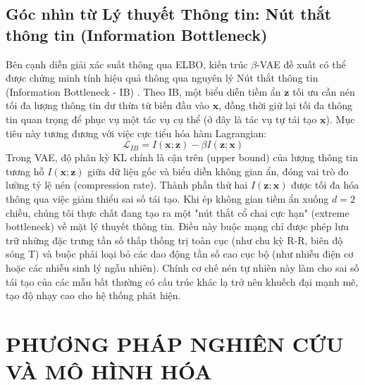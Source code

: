 \documentclass[conference]{IEEEtran}
\begin{document}
\subsection{Góc nhìn từ Lý thuyết Thông tin: Nút thắt thông tin (Information Bottleneck)}
Bên cạnh diễn giải xác suất thông qua ELBO, kiến trúc $\beta$-VAE đề xuất có thể được chứng minh tính hiệu quả thông qua nguyên lý Nút thắt thông tin (Information Bottleneck - IB) \cite{tishby_ib}. Theo IB, một biểu diễn tiềm ẩn $\mathbf{z}$ tối ưu cần nén tối đa lượng thông tin dư thừa từ biến đầu vào $\mathbf{x}$, đồng thời giữ lại tối đa thông tin quan trọng để phục vụ một tác vụ cụ thể (ở đây là tác vụ tự tái tạo $\mathbf{x}$).
Mục tiêu này tương đương với việc cực tiểu hóa hàm Lagrangian:
\begin{equation}
\mathcal{L}_{IB} = I(\mathbf{x}; \mathbf{z}) - \beta I(\mathbf{z}; \mathbf{x})
\end{equation}
Trong VAE, độ phân kỳ KL chính là cận trên (upper bound) của lượng thông tin tương hỗ $I(\mathbf{x}; \mathbf{z})$ giữa dữ liệu gốc và biểu diễn không gian ẩn, đóng vai trò đo lường tỷ lệ nén (compression rate). Thành phần thứ hai $I(\mathbf{z}; \mathbf{x})$ được tối đa hóa thông qua việc giảm thiểu sai số tái tạo. Khi ép không gian tiềm ẩn xuống $d=2$ chiều, chúng tôi thực chất đang tạo ra một "nút thắt cổ chai cực hạn" (extreme bottleneck) về mặt lý thuyết thông tin. Điều này buộc mạng chỉ được phép lưu trữ những đặc trưng tần số thấp thống trị toàn cục (như chu kỳ R-R, biên độ sóng T) và buộc phải loại bỏ các dao động tần số cao cục bộ (như nhiễu điện cơ hoặc các nhiễu sinh lý ngẫu nhiên). Chính cơ chế nén tự nhiên này làm cho sai số tái tạo của các mẫu bất thường có cấu trúc khác lạ trở nên khuếch đại mạnh mẽ, tạo độ nhạy cao cho hệ thống phát hiện.

\section{PHƯƠNG PHÁP NGHIÊN CỨU VÀ MÔ HÌNH HÓA}
\end{document}
